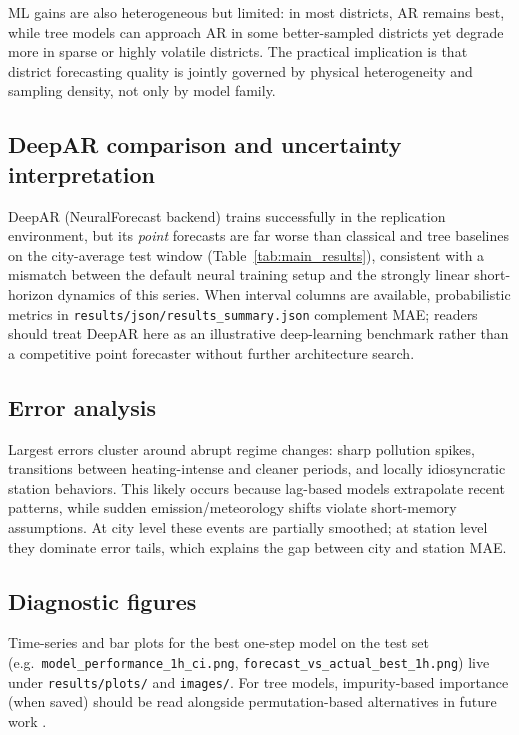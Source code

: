 \documentclass[11pt,a4paper]{article}
\begin{document}
ML gains are also heterogeneous but limited: in most districts, AR remains best, while tree models can approach AR in some better-sampled districts yet degrade more in sparse or highly volatile districts. The practical implication is that district forecasting quality is jointly governed by physical heterogeneity and sampling density, not only by model family.

\subsection{DeepAR comparison and uncertainty interpretation}

DeepAR (NeuralForecast backend) trains successfully in the replication environment, but its \emph{point} forecasts are far worse than classical and tree baselines on the city-average test window (Table~\ref{tab:main_results}), consistent with a mismatch between the default neural training setup and the strongly linear short-horizon dynamics of this series. When interval columns are available, probabilistic metrics in \texttt{results/json/results\_summary.json} complement MAE; readers should treat DeepAR here as an illustrative deep-learning benchmark rather than a competitive point forecaster without further architecture search.

\subsection{Error analysis}

Largest errors cluster around abrupt regime changes: sharp pollution spikes, transitions between heating-intense and cleaner periods, and locally idiosyncratic station behaviors. This likely occurs because lag-based models extrapolate recent patterns, while sudden emission/meteorology shifts violate short-memory assumptions. At city level these events are partially smoothed; at station level they dominate error tails, which explains the gap between city and station MAE.

\subsection{Diagnostic figures}

Time-series and bar plots for the best one-step model on the test set (e.g.\ \texttt{model\_performance\_1h\_ci.png}, \texttt{forecast\_vs\_actual\_best\_1h.png}) live under \texttt{results/plots/} and \texttt{images/}. For tree models, impurity-based importance (when saved) should be read alongside permutation-based alternatives in future work \citep{lundberg2017unified}.
\end{document}
